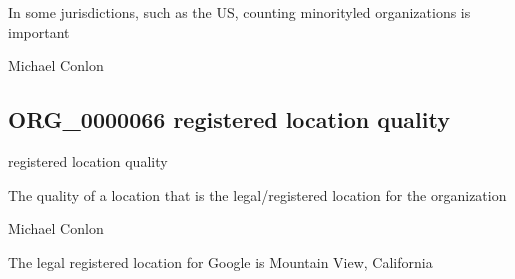 \documentclass[letterpaper,10pt,english]{sphinxmanual}
\begin{document}
\begin{sphinxShadowBox}

\sphinxAtStartPar
In some jurisdictions, such as the US, counting minority\sphinxhyphen{}led organizations is important
\end{sphinxShadowBox}

\begin{sphinxShadowBox}

\sphinxAtStartPar
Michael Conlon 
\end{sphinxShadowBox}
\begin{quote}

\ignorespaces \end{quote}


\subsection{ORG\_0000066 \sphinxhyphen{} registered location quality}
\label{\detokenize{doc-ORG_0000066:org-0000066-registered-location-quality}}\label{\detokenize{doc-ORG_0000066:index-0}}\label{\detokenize{doc-ORG_0000066::doc}}
\begin{sphinxShadowBox}

\sphinxAtStartPar
registered location quality
\end{sphinxShadowBox}

\begin{sphinxShadowBox}

\sphinxAtStartPar
The quality of a location that is the legal/registered location for the organization
\end{sphinxShadowBox}

\begin{sphinxShadowBox}

\sphinxAtStartPar
Michael Conlon 
\end{sphinxShadowBox}

\begin{sphinxShadowBox}

\sphinxAtStartPar
The legal registered location for Google is Mountain View, California
\end{sphinxShadowBox}
\end{document}
